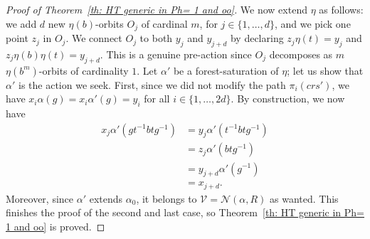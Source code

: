 \documentclass[12pt]{article}
\numberwithin{equation}{section}
\theoremstyle{definition}
\newcommand{\inv}{^{-1}}
\begin{document}
\begin{proof}[Proof of Theorem~\ref{th: HT generic in Ph= 1 and oo}]
    We now extend $\eta$ as follows:
    we add \( d \) new $\eta(b)$-orbits $O_j$ of cardinal $m$, for $j\in\{1,\dots,d\}$, and we pick one point $z_j$ in $O_j$.
    We connect $O_j$ to both $y_j$ and $y_{j+d}$ by declaring $z_j\eta(t)=y_j$
    and $z_j\eta(b)\eta(t)=y_{j+d}$.
    This is a genuine pre-action since $O_j$ decomposes as $m$ $\eta(b^m)$-orbits of cardinality $1$.
    Let $\alpha'$ be a forest-saturation of $\eta$; let us show that \(\alpha'\)
	is the action we seek.
	First, since we did not modify the path $\pi_i(crs')$, 
	we have $x_i\alpha(g) = x_i\alpha'(g) = y_i$ 
	for all $i\in\{1,\dots,2d\}$.
    By construction, we now have
    \begin{align*}
        x_j\alpha'(g t^{-1}btg^{-1}) & = y_j\alpha'(t^{-1}btg^{-1})\\
        & = z_j\alpha'(btg^{-1})\\
        & = y_{j+d}\alpha'(g\inv)\\
        & = x_{j+d}.
    \end{align*}
    Moreover, since $\alpha'$ extends \( \alpha_0 \), 
	it belongs to \( \mathcal V=\mathcal N(\alpha,R) \) as wanted. 
	This finishes the proof of the second and last case,
	so Theorem~\ref{th: HT generic in Ph= 1 and oo} is proved.
\end{proof}
\end{document}
